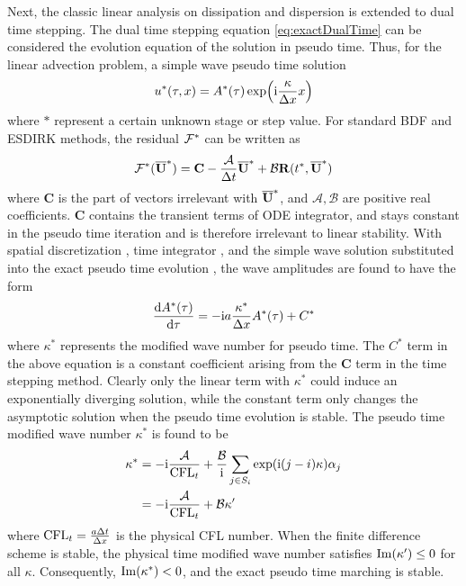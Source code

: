 \documentclass[preprint,12pt]{elsarticle}
\begin{document}
Next, the classic linear analysis on dissipation and dispersion is
extended to dual time stepping. The dual time
stepping equation \eqref{eq:exactDualTime} can be
considered the evolution equation of the solution in pseudo time.
Thus, for the linear advection problem,
a simple wave pseudo time solution
\begin{equation}
    u^*(\tau,x) = A^*(\tau)\exp(\mathrm{i} \frac{\kappa}{\mathrm\Delta x} x)
    \label{eq:simpleWaveTestTau}
\end{equation}
where $*$ represent a certain unknown stage or step value.
For standard BDF and ESDIRK methods, the residual $\mathcal{F}^*$
can be written as 
\begin{equation}
    \mathcal{F}^*(\overline{\mathbf{U}}^*) = \mathbf{C} - \frac{\mathcal{A}}{\mathrm\Delta t} \overline{\mathbf{U}}^* + \mathcal{B}\mathbf{R}(t^*, \overline{\mathbf{U}}^*)
    \label{eq:canonicalFF}
\end{equation}
where $\mathbf{C}$ is the part of vectors irrelevant with $\overline{\mathbf{U}}^*$,
and $\mathcal{A},\mathcal{B}$ are positive real coefficients. 
$\mathbf{C}$ contains the transient terms of ODE integrator, 
and stays constant in the pseudo time iteration and is 
therefore irrelevant to linear stability. 
With  spatial discretization ,
time integrator , 
and 
the simple wave solution 
substituted into the exact pseudo time evolution ,
the wave amplitudes are found to have the form
\begin{equation}
    \frac{\dd A^*(\tau)}{\dd \tau} = -\mathrm{i} a\frac{\kappa^*}{\mathrm\Delta x}  A^*(\tau) + C^*
    \label{eq:kappaSDefTau}
\end{equation}
where $\kappa^*$ represents the modified wave number for pseudo time.
The $C^*$ term in the above equation is a constant coefficient arising
from the $\mathbf{C}$ term in the time stepping method. 
Clearly only the linear term with $\kappa^*$ could induce an exponentially diverging 
solution, while the constant term only changes the asymptotic solution
when the pseudo time evolution is stable.
The pseudo time modified wave number $\kappa^*$ is found to be
\begin{equation}
    \begin{aligned}
        \kappa^* & = -\mathrm{i}\frac{\mathcal{A}}{\text{CFL}_t} +
        \frac{\mathcal{B}}{\mathrm{i}} \sum_{j\in S_i}\exp(\mathrm{i} (j-i)\kappa)\alpha_j \\
        & =-\mathrm{i}\frac{\mathcal{A}}{\text{CFL}_t} + \mathcal{B}\kappa'
    \end{aligned}
\end{equation}
where $\text{CFL}_t = \frac{a\mathrm\Delta t }{\mathrm\Delta x}$ is the physical CFL number.
When the finite difference scheme is stable, 
the physical time modified wave number satisfies $\mathrm{Im} (\kappa') \leq 0$ for 
all $\kappa$. 
Consequently, $\mathrm{Im} (\kappa^*) < 0$, and the exact pseudo time marching 
is stable.
\end{document}
